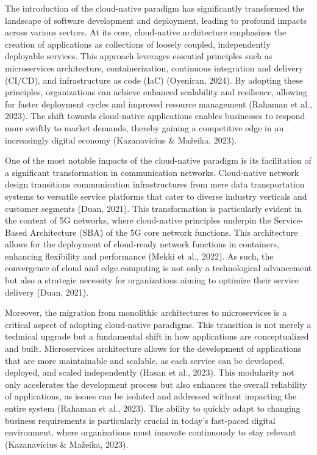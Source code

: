 The introduction of the cloud-native paradigm has significantly transformed the landscape of software development and deployment, leading to profound impacts across various sectors. At its core, cloud-native architecture emphasizes the creation of applications as collections of loosely coupled, independently deployable services. This approach leverages essential principles such as microservices architecture, containerization, continuous integration and delivery (CI/CD), and infrastructure as code (IaC) (Oyeniran, 2024). By adopting these principles, organizations can achieve enhanced scalability and resilience, allowing for faster deployment cycles and improved resource management (Rahaman et al., 2023). The shift towards cloud-native applications enables businesses to respond more swiftly to market demands, thereby gaining a competitive edge in an increasingly digital economy (Kazanavicius & Mažeika, 2023).

One of the most notable impacts of the cloud-native paradigm is its facilitation of a significant transformation in communication networks. Cloud-native network design transitions communication infrastructures from mere data transportation systems to versatile service platforms that cater to diverse industry verticals and customer segments (Duan, 2021). This transformation is particularly evident in the context of 5G networks, where cloud-native principles underpin the Service-Based Architecture (SBA) of the 5G core network functions. This architecture allows for the deployment of cloud-ready network functions in containers, enhancing flexibility and performance (Mekki et al., 2022). As such, the convergence of cloud and edge computing is not only a technological advancement but also a strategic necessity for organizations aiming to optimize their service delivery (Duan, 2021).

Moreover, the migration from monolithic architectures to microservices is a critical aspect of adopting cloud-native paradigms. This transition is not merely a technical upgrade but a fundamental shift in how applications are conceptualized and built. Microservices architecture allows for the development of applications that are more maintainable and scalable, as each service can be developed, deployed, and scaled independently (Hasan et al., 2023). This modularity not only accelerates the development process but also enhances the overall reliability of applications, as issues can be isolated and addressed without impacting the entire system (Rahaman et al., 2023). The ability to quickly adapt to changing business requirements is particularly crucial in today’s fast-paced digital environment, where organizations must innovate continuously to stay relevant (Kazanavicius & Mažeika, 2023).

